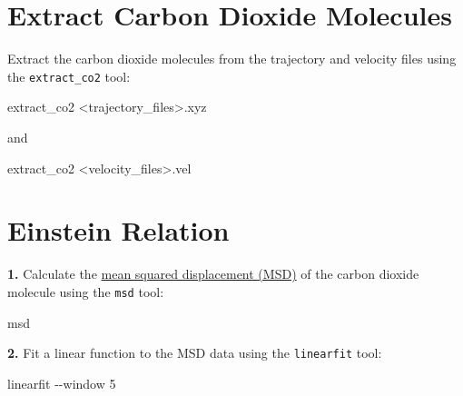 \documentclass[
  letterpaper,
  DIV=11,
  numbers=noendperiod]{scrreprt}
\newenvironment{Shaded}{\begin{snugshade}}{\end{snugshade}}
\newcommand{\AttributeTok}[1]{\textcolor[rgb]{0.40,0.45,0.13}{#1}}
\newcommand{\ExtensionTok}[1]{\textcolor[rgb]{0.00,0.23,0.31}{#1}}
\newcommand{\NormalTok}[1]{\textcolor[rgb]{0.00,0.23,0.31}{#1}}
\newcommand{\OperatorTok}[1]{\textcolor[rgb]{0.37,0.37,0.37}{#1}}
\begin{document}
\hypertarget{extract-carbon-dioxide-molecules}{%
\section*{Extract Carbon Dioxide
Molecules}\label{extract-carbon-dioxide-molecules}}


Extract the carbon dioxide molecules from the trajectory and velocity
files using the \texttt{extract\_co2} tool:

\begin{Shaded}
\begin{Highlighting}[]
\ExtensionTok{extract\_co2} \OperatorTok{\textless{}}\NormalTok{trajectory\_files}\OperatorTok{\textgreater{}}\NormalTok{.xyz}
\end{Highlighting}
\end{Shaded}

and

\begin{Shaded}
\begin{Highlighting}[]
\ExtensionTok{extract\_co2} \OperatorTok{\textless{}}\NormalTok{velocity\_files}\OperatorTok{\textgreater{}}\NormalTok{.vel}
\end{Highlighting}
\end{Shaded}

\hypertarget{einstein-relation}{%
\section*{Einstein Relation}\label{einstein-relation}}


\textbf{1.} Calculate the \protect\hyperlink{einstein-relation}{mean
squared displacement (MSD)} of the carbon dioxide molecule using the
\texttt{msd} tool:

\begin{Shaded}
\begin{Highlighting}[]
\ExtensionTok{msd}
\end{Highlighting}
\end{Shaded}

\textbf{2.} Fit a linear function to the MSD data using the
\texttt{linearfit} tool:

\begin{Shaded}
\begin{Highlighting}[]
\ExtensionTok{linearfit} \AttributeTok{{-}{-}window}\NormalTok{ 5}
\end{Highlighting}
\end{Shaded}
\end{document}
